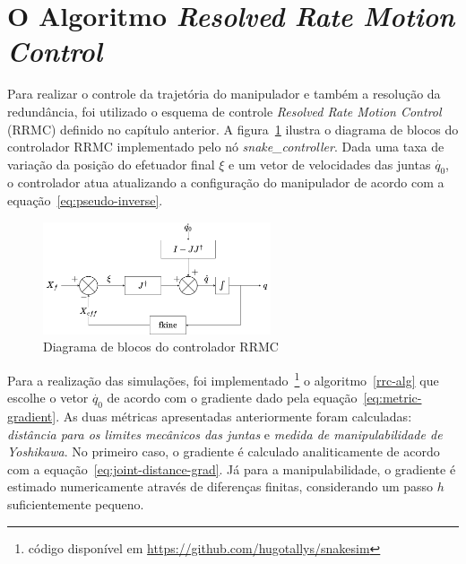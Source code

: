 \section{O Algoritmo \emph{Resolved Rate Motion Control}}

Para realizar o controle da trajetória do manipulador e também a resolução da
redundância, foi utilizado o esquema de controle \emph{Resolved Rate Motion Control} (RRMC)
definido no capítulo anterior. A figura~\ref{fig:block-diagram} ilustra o
diagrama de blocos do controlador RRMC implementado pelo nó
\emph{snake\_controller}. Dada uma taxa de variação da posição do efetuador
final \(\xi\) e um vetor de velocidades das juntas \(\dot{q_0}\), o controlador
atua atualizando a configuração do manipulador de acordo com a
equação~\ref{eq:pseudo-inverse}.

\begin{figure}
    \centering
    \includegraphics[width=0.6\textwidth]{./Images/control-scheme.png}
    \caption{Diagrama de blocos do controlador RRMC}\label{fig:block-diagram}
\end{figure}

Para a realização das simulações, foi implementado~\footnote{código disponível em 
\url{https://github.com/hugotallys/snakesim}}  o algoritmo~\ref{rrc-alg} que escolhe o vetor \(\dot{q_0}\)
 de acordo com o gradiente dado pela equação~\ref{eq:metric-gradient}. As duas métricas apresentadas anteriormente
foram calculadas: \emph{distância para os limites mecânicos das juntas} e
\emph{medida de manipulabilidade de Yoshikawa}. No primeiro caso, o gradiente é
calculado analiticamente de acordo com a equação~\ref{eq:joint-distance-grad}.
Já para a manipulabilidade, o gradiente é estimado numericamente através de
diferenças finitas, considerando um passo \(h\) suficientemente pequeno.

